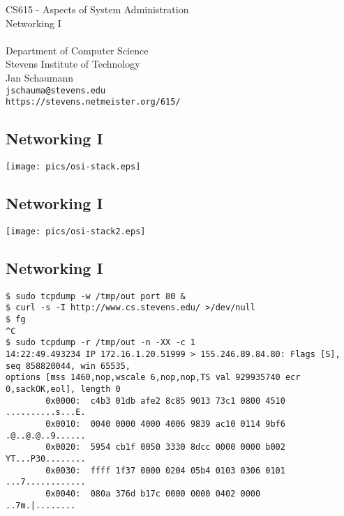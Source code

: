 \documentclass[xga]{xdvislides}
\begin{document}
\setfontphv

\lhead{\slidetitle}                               %
\cfoot{\relax}                               %
\rfoot{\Gray{\today}}

\vspace*{\fill}
\begin{center}
	\Hugesize
		CS615 - Aspects of System Administration\\ [1em]
		Networking I\\ [1em]
	\hspace*{5mm}\blueline\\ [1em]
	\Normalsize
		Department of Computer Science\\
		Stevens Institute of Technology\\
		Jan Schaumann\\
		\verb+jschauma@stevens.edu+\\
		\verb+https://stevens.netmeister.org/615/+
\end{center}
\vspace*{\fill}

\subsection{Networking I}
\vspace*{\fill}
\begin{center}
	\texttt{[image: pics/osi-stack.eps]}
\end{center}
\vspace*{\fill}

\subsection{Networking I}
\vspace*{\fill}
\begin{center}
	\texttt{[image: pics/osi-stack2.eps]}
\end{center}
\vspace*{\fill}

\subsection{Networking I}
\begin{verbatim}
$ sudo tcpdump -w /tmp/out port 80 &
$ curl -s -I http://www.cs.stevens.edu/ >/dev/null
$ fg
^C
$ sudo tcpdump -r /tmp/out -n -XX -c 1
14:22:49.493234 IP 172.16.1.20.51999 > 155.246.89.84.80: Flags [S], seq 858820044, win 65535,
options [mss 1460,nop,wscale 6,nop,nop,TS val 929935740 ecr 0,sackOK,eol], length 0
        0x0000:  c4b3 01db afe2 8c85 9013 73c1 0800 4510  ..........s...E.
        0x0010:  0040 0000 4000 4006 9839 ac10 0114 9bf6  .@..@.@..9......
        0x0020:  5954 cb1f 0050 3330 8dcc 0000 0000 b002  YT...P30........
        0x0030:  ffff 1f37 0000 0204 05b4 0103 0306 0101  ...7............
        0x0040:  080a 376d b17c 0000 0000 0402 0000       ..7m.|........
\end{verbatim}
\end{document}
